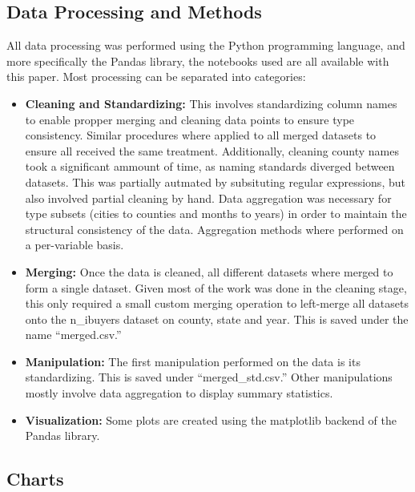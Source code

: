 
\subsection{Data Processing and Methods}\label{subsection_data_processing_and_methods}

All data processing was performed using the Python programming language, and more specifically the Pandas library, the notebooks used are all available with this paper. Most processing can be separated into categories:

\begin{itemize}

    \item \textbf{Cleaning and Standardizing:} This involves standardizing column names to enable propper merging and cleaning data points to ensure type consistency. Similar procedures where applied to all merged datasets to ensure all received the same treatment. Additionally, cleaning county names took a significant ammount of time, as naming standards diverged between datasets. This was partially autmated by subsituting regular expressions, but also involved partial cleaning by hand. Data aggregation was necessary for type subsets (cities to counties and months to years) in order to maintain the structural consistency of the data. Aggregation methods where performed on a per-variable basis.

    \item \textbf{Merging:} Once the data is cleaned, all different datasets where merged to form a single dataset. Given most of the work was done in the cleaning stage, this only required a small custom merging operation to left-merge all datasets onto the n\_ibuyers dataset on county, state and year. This is saved under the name ``merged.csv.''

    \item \textbf{Manipulation:} The first manipulation performed on the data is its standardizing. This is saved under ``merged\_std.csv.'' Other manipulations mostly involve data aggregation to display summary statistics.

    \item \textbf{Visualization:} Some plots are created using the matplotlib backend of the Pandas library. 

\end{itemize}

\pagebreak
\subsection{Charts}

